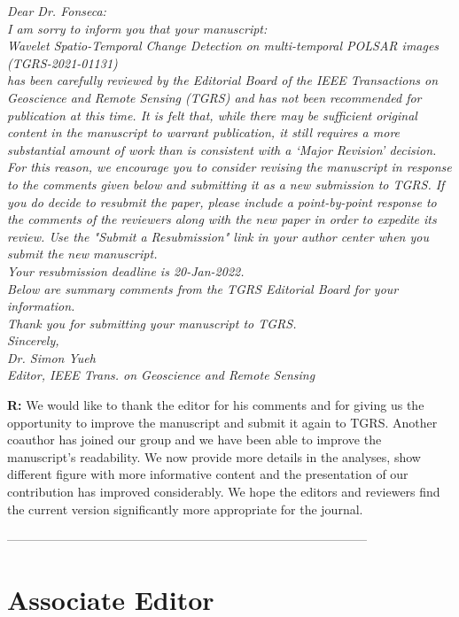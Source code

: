 \documentclass[11pt]{report}
\begin{document}
\textit{
Dear Dr. Fonseca:\\
I am sorry to inform you that your manuscript:\\
Wavelet Spatio-Temporal Change Detection on multi-temporal POLSAR images (TGRS-2021-01131)\\
has been carefully reviewed by the Editorial Board of the IEEE Transactions on Geoscience and Remote Sensing
(TGRS) and has not been recommended for publication at this time. It is felt that, while there may be sufficient original
content in the manuscript to warrant publication, it still requires a more substantial amount of work than is consistent with
a ‘Major Revision’ decision. For this reason, we encourage you to consider revising the manuscript in response to the
comments given below and submitting it as a new submission to TGRS. If you do decide to resubmit the paper, please
include a point-by-point response to the comments of the reviewers along with the new paper in order to expedite its
review. Use the "Submit a Resubmission" link in your author center when you submit the new manuscript.\\
Your resubmission deadline is 20-Jan-2022.\\
Below are summary comments from the TGRS Editorial Board for your information.\\
Thank you for submitting your manuscript to TGRS.\\
Sincerely,\\
Dr. Simon Yueh\\
Editor, IEEE Trans. on Geoscience and Remote Sensing
}

\medskip

\textbf{R:} We would like to thank the editor for his comments and for giving us the opportunity to improve the manuscript and submit it again to TGRS. Another coauthor has joined our group and we have been able to improve the manuscript's readability. We now provide more details in the analyses, show different figure with more informative content and the presentation of our contribution has improved considerably. We hope the editors and reviewers find the current version significantly more appropriate for the journal.

\noindent---------------------------------------------------------------------------------------
\section*{Associate Editor}
\end{document}
